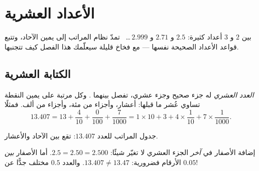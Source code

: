 \chapter{الأعداد العشرية}\label{ch:g6:decimals}

بين $2$ و $3$ أعداد كثيرة: $2.5$ و $2.71$
و $2.999$\,\dots\  تمدّ نظام المراتب إلى
يمين الآحاد، وتتبع قواعد الأعداد الصحيحة نفسها ---
مع فخاخ قليلة سيعلّمك هذا الفصل كيف تتجنبها.

\section{الكتابة العشرية}

\begin{definition}\label{def:g6:decimals:places}
\emph{العدد العشري} له جزء صحيح وجزء
عشري، تفصل بينهما . وكل مرتبة على يمين
النقطة تساوي عُشر ما قبلها: أعشار، وأجزاء من مئة،
وأجزاء من ألف. فمثلًا
\[
13.407 = 13 + \frac{4}{10} + \frac{0}{100} + \frac{7}{1000}
= 1 \times 10 + 3 + 4 \times \frac{1}{10} + 7 \times \frac{1}{1000}.
\]
\end{definition}

\begin{omfigure}

{\small جدول المراتب للعدد $13.407$:  تقع
بين الآحاد والأعشار.}
\end{omfigure}

\begin{remark}
إضافة الأصفار في \emph{آخر} الجزء العشري لا تغيّر شيئًا:
$2.5 = 2.50 = 2.500$. أما الأصفار \emph{بين} الأرقام فضرورية:
$13.407 \neq 13.47$. والعدد $0.5$ مختلف جدًّا عن $0.05$!
\end{remark}

